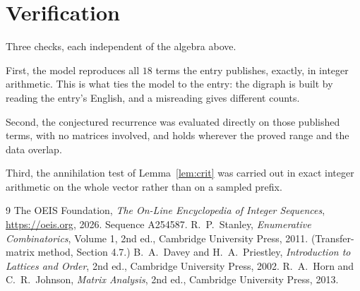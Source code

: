 \documentclass[11pt,a4paper]{article}
\theoremstyle{plain}
\theoremstyle{definition}
\begin{document}
\section{Verification}

Three checks, each independent of the algebra above.

First, the model reproduces all $18$ terms the entry publishes, exactly, in integer
arithmetic. This is what ties the model to the entry: the digraph is built by reading the
entry's English, and a misreading gives different counts.

Second, the conjectured recurrence was evaluated directly on those published terms, with no
matrices involved, and holds wherever the proved range and the data overlap.

Third, the annihilation test of Lemma~\ref{lem:crit} was carried out in exact integer
arithmetic on the whole vector rather than on a sampled prefix.

\begin{thebibliography}{9}
 The OEIS Foundation, \emph{The On-Line Encyclopedia of Integer
Sequences}, \url{https://oeis.org}, 2026. Sequence A254587.
 R.~P.~Stanley, \emph{Enumerative Combinatorics}, Volume 1, 2nd ed.,
Cambridge University Press, 2011. (Transfer-matrix method, Section 4.7.)
 B.~A.~Davey and H.~A.~Priestley, \emph{Introduction to Lattices and
Order}, 2nd ed., Cambridge University Press, 2002.
 R.~A.~Horn and C.~R.~Johnson, \emph{Matrix Analysis}, 2nd ed., Cambridge
University Press, 2013.
\end{thebibliography}
\end{document}
